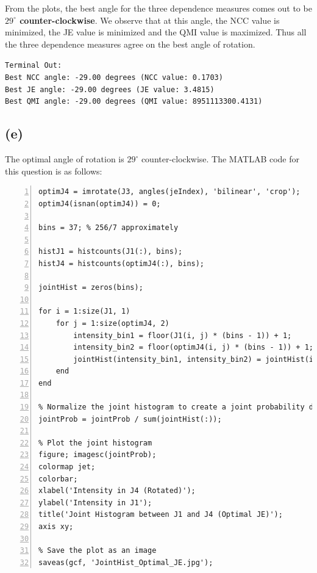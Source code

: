 \documentclass{article}
\begin{document}
From the plots, the best angle for the three dependence measures comes out to be \textbf{$29^{\circ}$ counter-clockwise}. We observe that at this angle, the NCC value is minimized, the JE value is minimized and the QMI value is maximized.
Thus all the three dependence measures agree on the best angle of rotation.

\vspace{5pt}
\texttt{Terminal Out:\\Best NCC angle: -29.00 degrees (NCC value: 0.1703)\\
Best JE angle: -29.00 degrees (JE value: 3.4815)\\
Best QMI angle: -29.00 degrees (QMI value: 8951113300.4131)}

\newpage
\subsection*{(e)}

The optimal angle of rotation is $29^{\circ}$ counter-clockwise. The MATLAB code for this question is as follows:
\begin{lstlisting}[frame=single,numbers=left,style=Matlab-Pyglike,breaklines=true,postbreak=\mbox{\textcolor{red}{$\hookrightarrow$}\space}]
optimJ4 = imrotate(J3, angles(jeIndex), 'bilinear', 'crop');
optimJ4(isnan(optimJ4)) = 0;

bins = 37; % 256/7 approximately

histJ1 = histcounts(J1(:), bins);
histJ4 = histcounts(optimJ4(:), bins);

jointHist = zeros(bins);

for i = 1:size(J1, 1)
    for j = 1:size(optimJ4, 2)
        intensity_bin1 = floor(J1(i, j) * (bins - 1)) + 1;
        intensity_bin2 = floor(optimJ4(i, j) * (bins - 1)) + 1;
        jointHist(intensity_bin1, intensity_bin2) = jointHist(intensity_bin1, intensity_bin2) + 1;
    end
end

% Normalize the joint histogram to create a joint probability distribution
jointProb = jointProb / sum(jointHist(:));

% Plot the joint histogram
figure; imagesc(jointProb);
colormap jet;
colorbar;
xlabel('Intensity in J4 (Rotated)');
ylabel('Intensity in J1');
title('Joint Histogram between J1 and J4 (Optimal JE)');
axis xy;
    
% Save the plot as an image
saveas(gcf, 'JointHist_Optimal_JE.jpg');
\end{lstlisting}
\end{document}
